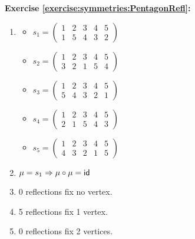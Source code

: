 \noindent\textbf{Exercise \ref{exercise:symmetries:PentagonRefl}:}
\begin{enumerate}[{a.}]
\item
	\begin{multicols}{2}
	\begin{itemize}
	\item
	$s_1 =\begin{pmatrix}
	1 & 2 & 3 & 4 & 5\\
	1 & 5 & 4 & 3 & 2
	\end{pmatrix}$
	
	\item
	$s_2 =\begin{pmatrix}
	1 & 2 & 3 & 4 & 5\\
	3 & 2 & 1 & 5 & 4
	\end{pmatrix}$
	
	\item
	$s_3 =\begin{pmatrix}
	1 & 2 & 3 & 4 & 5\\
	5 & 4 & 3 & 2 & 1
	\end{pmatrix}$
	
	\item
	$s_4 =\begin{pmatrix}
	1 & 2 & 3 & 4 & 5\\
	2 & 1 & 5 & 4 & 3
	\end{pmatrix}$
	
	\item
	$s_5 =\begin{pmatrix}
	1 & 2 & 3 & 4 & 5\\
	4 & 3 & 2 & 1 & 5
	\end{pmatrix}$
	\end{itemize}
	\end{multicols}
	
\item
$\mu = s_1 \Rightarrow \mu \circ \mu = \sf{id}$

\item
0 reflections fix no vertex.

\item
5 reflections fix 1 vertex.

\item
0 reflections fix 2 vertices.
\end{enumerate}

